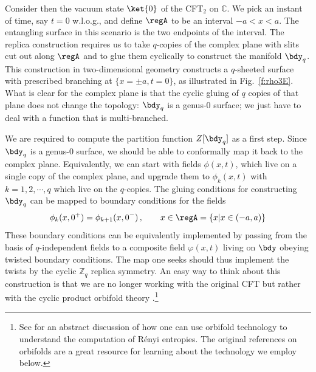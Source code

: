 \documentclass[12pt,openany]{book}
\begin{document}
Consider  then the vacuum state $\ket{0}$ of the CFT$_2$ on ${\mathbb C}$. We pick an instant of time, say $t=0$ w.l.o.g., and define $\regA$ to be an interval $-a < x < a$. The entangling surface in this scenario is the two endpoints of the interval. The replica construction requires us to take $q$-copies of the complex plane with slits cut out along $\regA$ and to glue them cyclically to construct the manifold $\bdy_q$. This construction in two-dimensional geometry constructs a $q$-sheeted surface with prescribed branching at $\{x= \pm a, t =0\}$, as illustrated in Fig.~\ref{f:rho3E}.  What is clear for the complex plane is that the cyclic gluing of $q$ copies of that plane does not change the topology:  $\bdy_q$ is a genus-0 surface; we just have to deal with a function that is multi-branched.

We are required to compute the partition function $Z[\bdy_q]$  as a first step. Since $\bdy_q$ is a genus-0 surface, we should be able to conformally map it back to the complex plane. Equivalently, we can start with fields $\phi(x,t)$, which live on a single copy of the complex plane, and upgrade them to $\phi_k (x,t)$ with $k=1,2,\cdots,q$ which live on the $q$-copies. The gluing conditions for constructing $\bdy_q$ can be mapped to boundary conditions for the fields
%
\begin{equation}
\phi_k(x,0^+)  = \phi_{k+1}(x,0^-) \,, \qquad x \in \regA = \{ x| x \in (-a,a)\}
\label{eq:bcscft}
\end{equation}
%
These boundary conditions can be equivalently implemented by passing from the basis of $q$-independent fields to a composite field $\varphi(x,t)$ living on $\bdy$ obeying twisted boundary conditions. The map one seeks should thus implement the twists  by the cyclic ${\mathbb Z}_q$ replica symmetry. An  easy way to think about this construction is that we are  no longer working with the original CFT but rather with the cyclic product orbifold theory \cite{Headrick:2010zt}.\footnote{ See \cite{Haehl:2014yla} for an abstract discussion of how one can use orbifold technology to understand the computation of R\'enyi entropies. The original references on orbifolds \cite{Dixon:1986jc,Dixon:1986qv} are a great resource for learning about the technology we employ below.}
\end{document}
